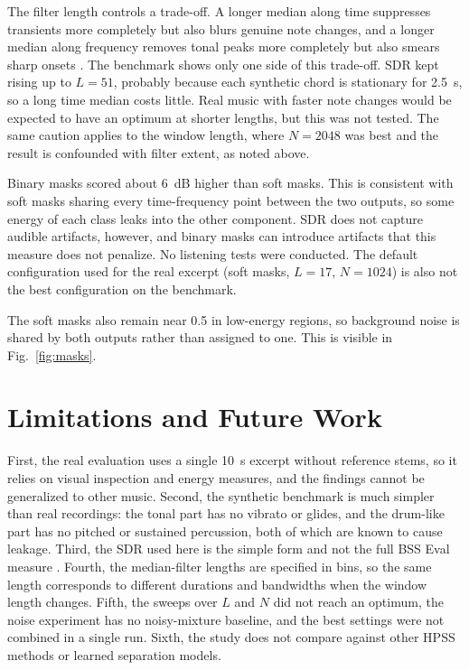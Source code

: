 \documentclass[conference]{IEEEtran}
\begin{document}
The filter length controls a trade-off. A longer median along time suppresses transients more completely but also blurs genuine note changes, and a longer median along frequency removes tonal peaks more completely but also smears sharp onsets \cite{fitzgerald2010}. The benchmark shows only one side of this trade-off. SDR kept rising up to $L=51$, probably because each synthetic chord is stationary for 2.5~s, so a long time median costs little. Real music with faster note changes would be expected to have an optimum at shorter lengths, but this was not tested. The same caution applies to the window length, where $N=2048$ was best and the result is confounded with filter extent, as noted above.

Binary masks scored about 6~dB higher than soft masks. This is consistent with soft masks sharing every time-frequency point between the two outputs, so some energy of each class leaks into the other component. SDR does not capture audible artifacts, however, and binary masks can introduce artifacts that this measure does not penalize. No listening tests were conducted. The default configuration used for the real excerpt (soft masks, $L=17$, $N=1024$) is also not the best configuration on the benchmark.

The soft masks also remain near 0.5 in low-energy regions, so background noise is shared by both outputs rather than assigned to one. This is visible in Fig.~\ref{fig:masks}.

\section{Limitations and Future Work}
First, the real evaluation uses a single 10~s excerpt without reference stems, so it relies on visual inspection and energy measures, and the findings cannot be generalized to other music. Second, the synthetic benchmark is much simpler than real recordings: the tonal part has no vibrato or glides, and the drum-like part has no pitched or sustained percussion, both of which are known to cause leakage. Third, the SDR used here is the simple form and not the full BSS Eval measure \cite{vincent2006}. Fourth, the median-filter lengths are specified in bins, so the same length corresponds to different durations and bandwidths when the window length changes. Fifth, the sweeps over $L$ and $N$ did not reach an optimum, the noise experiment has no noisy-mixture baseline, and the best settings were not combined in a single run. Sixth, the study does not compare against other HPSS methods or learned separation models.
\end{document}
